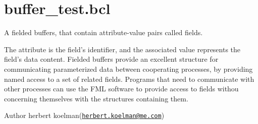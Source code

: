 \hypertarget{buffer_test_8bcl-example}{\section{buffer\+\_\+test.\+bcl}
}
A fielded buffers, that contain attribute-\/value pairs called fields.

The attribute is the field’s identifier, and the associated value represents the field’s data content. Fielded buffers provide an excellent structure for communicating parameterized data between cooperating processes, by providing named access to a set of related fields. Programs that need to communicate with other processes can use the F\+M\+L software to provide access to fields withou concerning themselves with the structures containing them.

\begin{DoxyAuthor}{Author}
herbert koelman(\href{mailto:herbert.koelman@me.com}{\tt herbert.\+koelman@me.\+com})
\end{DoxyAuthor}

